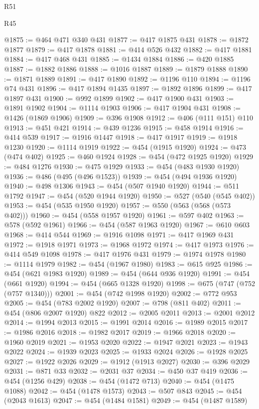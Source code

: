 \begin{lexlean}{R51}
\begin{lexlean}{R45}
\begin{coremodule}
{{{{{{{{{{{{{{{{{{{{{{{{{{{{{{{{{{{{{{{{{{{{{{{{{{{{{{{{{{{{{{{{{{{{{{{{{{{{{{{{{{{{{{{{{{{@1875 := @464 @471 @340 @431
@1877 := @417 @1875 @431
@1878 := @1872 @1877
@1879 := @417 @1878
@1881 := @414 @526 @432
@1882 := @417 @1881
@1884 := @417 @468 @431
@1885 := @1434 @1884
@1886 := @420 @1885
@1887 := @1882 @1886
@1888 := @1016 @1887
@1889 := @1879 @1888
@1890 := @1871 @1889
@1891 := @417 @1890
@1892 := @1196 @110
@1894 := @1196 @74 @431
@1896 := @417 @1894 @1435
@1897 := @1892 @1896
@1899 := @417 @1897 @431
@1900 := @992 @1899
@1902 := @417 @1900 @431
@1903 := @1891 @1902
@1904 := @1114 @1903
@1906 := @417 @1904 @431
@1908 := @1426 (@1869 @1906)
@1909 := @396 @1908
@1912 := @406 (@111 @151) @110
@1913 := @451 @421
@1914 := @439 @1236
@1915 := @458 @1914
@1916 := @414 @539
@1917 := @1916 @1447
@1918 := @417 @1917
@1919 := @1918 @1230
@1920 := @1114 @1919
@1922 := @454 (@1915 @1920)
@1924 := @473 (@474 @402)
@1925 := @460 @1924
@1928 := @454 (@472 @1925 @1920)
@1929 := @484 @1276
@1930 := @475 @1929
@1933 := @454 (@483 @1930 @1920)
@1936 := @486 (@495 (@496 @1523))
@1939 := @454 (@494 @1936 @1920)
@1940 := @498 @1306
@1943 := @454 (@507 @1940 @1920)
@1944 := @511 @1792
@1947 := @454 (@520 @1944 @1920)
@1950 := @527 (@540 (@545 @402))
@1953 := @454 (@535 @1950 @1920)
@1957 := @550 (@563 (@568 (@573 @402)))
@1960 := @454 (@558 @1957 @1920)
@1961 := @597 @402
@1963 := @578 (@592 @1961)
@1966 := @454 (@587 @1963 @1920)
@1967 := @610 @603
@1968 := @414 @544
@1969 := @1916 @1098
@1971 := @417 @1969 @431
@1972 := @1918 @1971
@1973 := @1968 @1972
@1974 := @417 @1973
@1976 := @414 @549 @1098
@1978 := @417 @1976 @431
@1979 := @1974 @1978
@1980 := @1114 @1979
@1982 := @454 (@1967 @1980)
@1983 := @615 @925
@1986 := @454 (@621 @1983 @1920)
@1989 := @454 (@644 @936 @1920)
@1991 := @454 (@661 @1920)
@1994 := @454 (@665 @1328 @1920)
@1998 := @675 (@747 (@752 (@757 @1340)))
@2001 := @454 (@742 @1998 @1920)
@2002 := @772 @953
@2005 := @454 (@783 @2002 @1920)
@2007 := @798 (@811 @402)
@2011 := @454 (@806 @2007 @1920) @822
@2012 := @2005 @2011
@2013 := @2001 @2012
@2014 := @1994 @2013
@2015 := @1991 @2014
@2016 := @1989 @2015
@2017 := @1986 @2016
@2018 := @1982 @2017
@2019 := @1966 @2018
@2020 := @1960 @2019
@2021 := @1953 @2020
@2022 := @1947 @2021
@2023 := @1943 @2022
@2024 := @1939 @2023
@2025 := @1933 @2024
@2026 := @1928 @2025
@2027 := @1922 @2026
@2029 := @1912 (@1913 @2027)
@2030 := @396 @2029
@2031 := @871 @33
@2032 := @2031 @37
@2034 := @450 @37 @419
@2036 := @454 (@1256 @429)
@2038 := @454 (@1472 @713)
@2040 := @454 (@1475 @1088)
@2042 := @454 (@1478 @1573)
@2043 := @507 @843
@2045 := @454 (@2043 @1613)
@2047 := @454 (@1484 @1581)
@2049 := @454 (@1487 @1589)
}}}}}}}}}}}}}}}}}}}}}}}}}}}}}}}}}}}}}}}}}}}}}}}}}}}}}}}}}}}}}}}}}}}}}}}}}}}}}}}}}}}}}}}}}}}
\end{coremodule}
\end{lexlean}
\end{lexlean}
